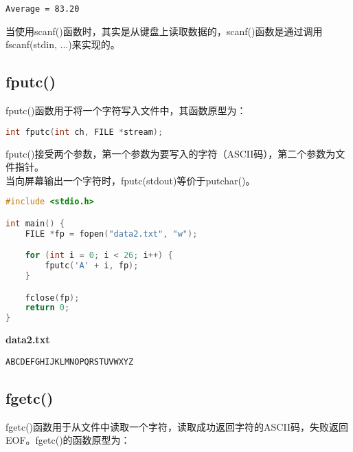 \begin{tcolorbox}
    \begin{verbatim}
Average = 83.20
	\end{verbatim}
\end{tcolorbox}

当使用scanf()函数时，其实是从键盘上读取数据的，scanf()函数是通过调用fscanf(stdin, ...)来实现的。\\

\subsection{fputc()}

fputc()函数用于将一个字符写入文件中，其函数原型为：

\vspace{-0.5cm}

\begin{lstlisting}[language=C]
int fputc(int ch, FILE *stream);
\end{lstlisting}

fputc()接受两个参数，第一个参数为要写入的字符（ASCII码），第二个参数为文件指针。\\

当向屏幕输出一个字符时，fputc(stdout)等价于putchar()。\\


\begin{lstlisting}[language=C]
#include <stdio.h>

int main() {
    FILE *fp = fopen("data2.txt", "w");

    for (int i = 0; i < 26; i++) {
        fputc('A' + i, fp);
    }

    fclose(fp);
    return 0;
}
\end{lstlisting}

\begin{tcolorbox}
    \textbf{data2.txt}
    \begin{verbatim}
ABCDEFGHIJKLMNOPQRSTUVWXYZ
	\end{verbatim}
\end{tcolorbox}

\vspace{0.5cm}

\subsection{fgetc()}

fgetc()函数用于从文件中读取一个字符，读取成功返回字符的ASCII码，失败返回EOF。fgetc()的函数原型为：

